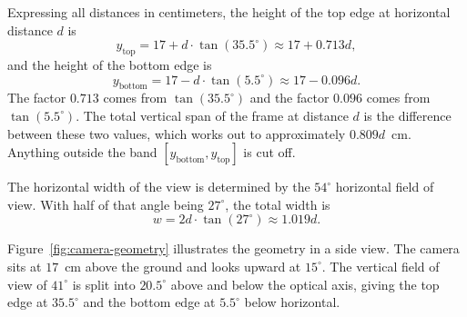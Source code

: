 \documentclass[a4paper,12pt]{report}
\begin{document}
Expressing all distances in centimeters, the height of the top edge at horizontal distance $d$ is
\begin{equation}
y_{\text{top}} = 17 + d \cdot \tan(35.5^\circ) \approx 17 + 0.713d,
\end{equation}
and the height of the bottom edge is
\begin{equation}
y_{\text{bottom}} = 17 - d \cdot \tan(5.5^\circ) \approx 17 - 0.096d.
\end{equation}
The factor $0.713$ comes from $\tan(35.5^\circ)$ and the factor $0.096$ comes from
$\tan(5.5^\circ)$. The total vertical span of the frame at distance $d$ is the difference between
these two values, which works out to approximately $0.809d$~cm. Anything outside the band
$[y_{\text{bottom}}, y_{\text{top}}]$ is cut off.

The horizontal width of the view is determined by the $54^\circ$ horizontal field of view. With half
of that angle being $27^\circ$, the total width is
\begin{equation}
w = 2d \cdot \tan(27^\circ) \approx 1.019d.
\end{equation}

Figure~\ref{fig:camera-geometry} illustrates the geometry in a side view. The camera sits at
$17$~cm above the ground and looks upward at $15^\circ$. The vertical field of view of $41^\circ$
is split into $20.5^\circ$ above and below the optical axis, giving the top edge at $35.5^\circ$
and the bottom edge at $5.5^\circ$ below horizontal.
\end{document}
